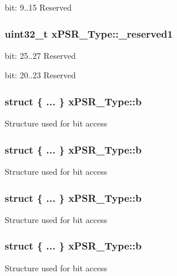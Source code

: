 bit\+: 9..15 Reserved 
\subsubsection[{\texorpdfstring{\+\_\+reserved1}{_reserved1}}]{\setlength{\rightskip}{0pt plus 5cm}uint32\+\_\+t x\+P\+S\+R\+\_\+\+Type\+::\+\_\+reserved1}\hypertarget{unionxPSR__Type_a790056bb6f20ea16cecc784b0dd19ad6}{}\label{unionxPSR__Type_a790056bb6f20ea16cecc784b0dd19ad6}
bit\+: 25..27 Reserved

bit\+: 20..23 Reserved 
\subsubsection[{\texorpdfstring{b}{b}}]{\setlength{\rightskip}{0pt plus 5cm}struct \{ ... \}   x\+P\+S\+R\+\_\+\+Type\+::b}\hypertarget{unionxPSR__Type_a477983eb9f0417d63288ddf538d7060b}{}\label{unionxPSR__Type_a477983eb9f0417d63288ddf538d7060b}
Structure used for bit access 
\subsubsection[{\texorpdfstring{b}{b}}]{\setlength{\rightskip}{0pt plus 5cm}struct \{ ... \}   x\+P\+S\+R\+\_\+\+Type\+::b}\hypertarget{unionxPSR__Type_aadeab5e1061c379c66bd3e4c97c1c413}{}\label{unionxPSR__Type_aadeab5e1061c379c66bd3e4c97c1c413}
Structure used for bit access 
\subsubsection[{\texorpdfstring{b}{b}}]{\setlength{\rightskip}{0pt plus 5cm}struct \{ ... \}   x\+P\+S\+R\+\_\+\+Type\+::b}\hypertarget{unionxPSR__Type_a35f742ca1c07eab4859f2b004b7061c8}{}\label{unionxPSR__Type_a35f742ca1c07eab4859f2b004b7061c8}
Structure used for bit access 
\subsubsection[{\texorpdfstring{b}{b}}]{\setlength{\rightskip}{0pt plus 5cm}struct \{ ... \}   x\+P\+S\+R\+\_\+\+Type\+::b}\hypertarget{unionxPSR__Type_ad71fd533922cd07ce4a8f8c4716b0116}{}\label{unionxPSR__Type_ad71fd533922cd07ce4a8f8c4716b0116}
Structure used for bit access 
